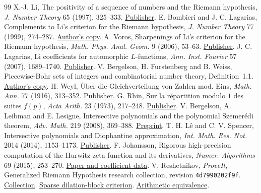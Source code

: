 \begin{thebibliography}{99}
\setlength{\itemsep}{2pt}
 X.-J. Li, The positivity of a sequence of numbers and the
Riemann hypothesis, \emph{J. Number Theory} 65 (1997), 325--333.
\href{https://doi.org/10.1006/jnth.1997.2137}{Publisher}.
 E. Bombieri and J. C. Lagarias, Complements to Li's criterion
for the Riemann hypothesis, \emph{J. Number Theory} 77 (1999), 274--287.
\href{https://websites.umich.edu/~lagarias/doc/bombieri.pdf}{Author's copy}.
 A. Voros, Sharpenings of Li's criterion for the Riemann
hypothesis, \emph{Math. Phys. Anal. Geom.} 9 (2006), 53--63.
\href{https://doi.org/10.1007/s11040-005-9002-8}{Publisher}.
 J. C. Lagarias, Li coefficients for automorphic $L$-functions,
\emph{Ann. Inst. Fourier} 57 (2007), 1689--1740.
\href{https://doi.org/10.5802/aif.2311}{Publisher}.
 V. Bergelson, H. Furstenberg and B. Weiss, Piecewise-Bohr sets
of integers and combinatorial number theory, Definition~1.1.
\href{https://people.math.osu.edu/bergelson.1/BFW_Bohr.pdf}{Author's copy}.
 H. Weyl, \"Uber die Gleichverteilung von Zahlen mod. Eins,
\emph{Math. Ann.} 77 (1916), 313--352.
\href{https://doi.org/10.1007/BF01475864}{Publisher}.
 G. Rhin, Sur la r\'epartition modulo $1$ des suites $f(p)$,
\emph{Acta Arith.} 23 (1973), 217--248.
\href{https://doi.org/10.4064/aa-23-3-217-248}{Publisher}.
 V. Bergelson, A. Leibman and E. Lesigne, Intersective
polynomials and the polynomial Szemer\'edi theorem,
\emph{Adv. Math.} 219 (2008), 369--388.
\href{https://arxiv.org/abs/0710.4862}{Preprint}.
 T. H. L\^e and C. V. Spencer, Intersective polynomials and
Diophantine approximation, \emph{Int. Math. Res. Not.} 2014 (2014), 1153--1173.
\href{https://doi.org/10.1093/imrn/rns242}{Publisher}.
 F. Johansson, Rigorous high-precision computation of the Hurwitz
zeta function and its derivatives, \emph{Numer. Algorithms} 69 (2015), 253--270.
\href{https://fredrikj.net/math/hurwitz_zeta.html}{Paper and coefficient data}.
 V. Reshetnikov, \emph{ProveIt}, Generalized Riemann Hypothesis
research collection, revision \texttt{4d7990202f9f}.
\href{https://github.com/VladimirReshetnikov/ProveIt/tree/4d7990202f9f106b2ffe8c209f073ad01d5e1987/Analysis/GeneralizedRiemannHypothesis}{Collection}.
\href{https://github.com/VladimirReshetnikov/ProveIt/blob/4d7990202f9f106b2ffe8c209f073ad01d5e1987/Analysis/GeneralizedRiemannHypothesis/Research/grh_method_transfers_research/li.tex}{Sparse dilation-block criterion}.
\href{https://github.com/VladimirReshetnikov/ProveIt/blob/4d7990202f9f106b2ffe8c209f073ad01d5e1987/Analysis/GeneralizedRiemannHypothesis/Research/grh_method_transfers_research/rigidity.tex}{Arithmetic equivalence}.

\end{thebibliography}
